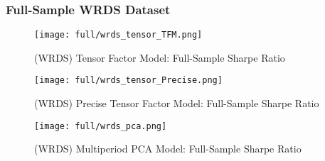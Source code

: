 \subsubsection{Full-Sample WRDS Dataset}

\begin{figure}[H]
    \centering
    \texttt{[image: full/wrds\_tensor\_TFM.png]}
    \caption{(WRDS) Tensor Factor Model: Full-Sample Sharpe Ratio}
    \label{fig:wrds-primary-tfm}
\end{figure}

\begin{figure}[H]
    \centering
    \texttt{[image: full/wrds\_tensor\_Precise.png]}
    \caption{(WRDS) Precise Tensor Factor Model: Full-Sample Sharpe Ratio}
    \label{fig:wrds-primary-precise}
\end{figure}


\begin{figure}[H]
    \centering
    \texttt{[image: full/wrds\_pca.png]}
    \caption{(WRDS) Multiperiod PCA Model: Full-Sample Sharpe Ratio}
    \label{fig:wrds-primary-pca}
\end{figure}
